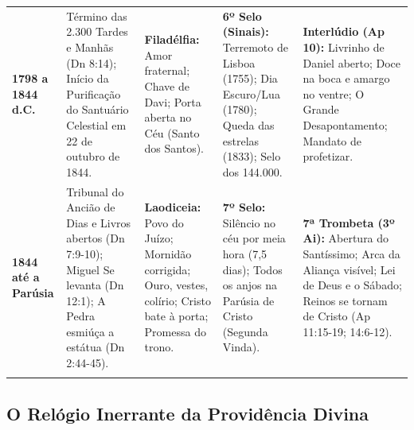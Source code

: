 \documentclass[11pt,a4paper,openany]{book}
\begin{document}
\begin{table}[htbp]
\begin{tabularx}{\textwidth}{>{\raggedright\arraybackslash}p{} >{\raggedright\arraybackslash}X >{\raggedright\arraybackslash}X >{\raggedright\arraybackslash}X >{\raggedright\arraybackslash}X}
\addlinespace[3pt]
\textbf{1798 a 1844 d.C.} & Término das 2.300 Tardes e Manhãs (Dn 8:14); Início da Purificação do Santuário Celestial em 22 de outubro de 1844. & \textbf{Filadélfia:} Amor fraternal; Chave de Davi; Porta aberta no Céu (Santo dos Santos). & \textbf{6º Selo (Sinais):} Terremoto de Lisboa (1755); Dia Escuro/Lua (1780); Queda das estrelas (1833); Selo dos 144.000. & \textbf{Interlúdio (Ap 10):} Livrinho de Daniel aberto; Doce na boca e amargo no ventre; O Grande Desapontamento; Mandato de profetizar. \\
\addlinespace[3pt]
\textbf{1844 até a Parúsia} & Tribunal do Ancião de Dias e Livros abertos (Dn 7:9-10); Miguel Se levanta (Dn 12:1); A Pedra esmiúça a estátua (Dn 2:44-45). & \textbf{Laodiceia:} Povo do Juízo; Mornidão corrigida; Ouro, vestes, colírio; Cristo bate à porta; Promessa do trono. & \textbf{7º Selo:} Silêncio no céu por meia hora (7,5 dias); Todos os anjos na Parúsia de Cristo (Segunda Vinda). & \textbf{7ª Trombeta (3º Ai):} Abertura do Santíssimo; Arca da Aliança visível; Lei de Deus e o Sábado; Reinos se tornam de Cristo (Ap 11:15-19; 14:6-12). \\
\addlinespace[3pt]
\bottomrule
\end{tabularx}
\end{table}




\subsection{O Relógio Inerrante da Providência Divina}
\end{document}
